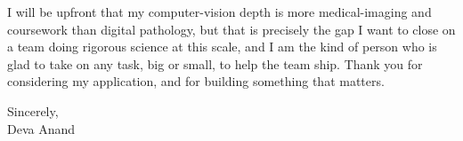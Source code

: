 \documentclass[letterpaper,11pt]{article}
\begin{document}
I will be upfront that my computer-vision depth is more medical-imaging and coursework than digital pathology, but that is precisely the gap I want to close on a team doing rigorous science at this scale, and I am the kind of person who is glad to take on any task, big or small, to help the team ship. Thank you for considering my application, and for building something that matters.

\vspace{6pt}

\noindent Sincerely,\\
Deva Anand
\end{document}
